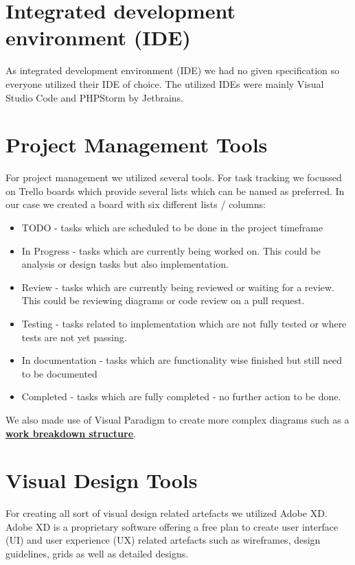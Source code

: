 \section{Integrated development environment (IDE)}\label{sec:integrated-development-environment-(ide)}

As integrated development environment (IDE) we had no given specification so everyone utilized their IDE of choice.
The utilized IDEs were mainly Visual Studio Code and PHPStorm by Jetbrains.


\section{Project Management Tools}\label{sec:project-management-tools}

For project management we utilized several tools.
For task tracking we focussed on Trello boards which provide several lists which can be named as preferred.
In our case we created a board with six different lists / columns:

\begin{itemize}
    \item TODO - tasks which are scheduled to be done in the project timeframe
    \item In Progress - tasks which are currently being worked on.
            This could be analysis or design tasks but also implementation.
    \item Review - tasks which are currently being reviewed or waiting for a review.
            This could be reviewing diagrams or code review on a pull request.
    \item Testing - tasks related to implementation which are not fully tested or where tests are not yet passing.
    \item In documentation - tasks which are functionality wise finished but still need to be documented
    \item Completed - tasks which are fully completed - no further action to be done.
\end{itemize}

We also made use of Visual Paradigm to create more complex diagrams such as a 
\textbf{\hyperref[sec:work-breakdown-structure-(wbs)]{work breakdown structure}}.

\section{Visual Design Tools}\label{sec:visual-design-tools}

For creating all sort of visual design related artefacts we utilized Adobe XD\@.
Adobe XD is a proprietary software offering a free plan to create user interface (UI) and user experience (UX)
related artefacts such as wireframes, design guidelines, grids as well as detailed designs.
